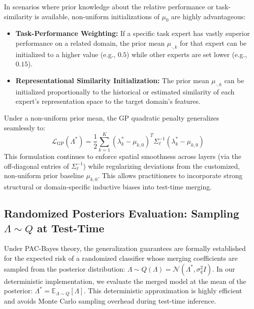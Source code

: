 \documentclass{article}
\theoremstyle{plain}
\theoremstyle{definition}
\theoremstyle{remark}
\begin{document}
In scenarios where prior knowledge about the relative performance or task-similarity is available, non-uniform initializations of $\mu_0$ are highly advantageous:
\begin{itemize}
    \item \textbf{Task-Performance Weighting:} If a specific task expert has vastly superior performance on a related domain, the prior mean $\mu_{\cdot, k}$ for that expert can be initialized to a higher value (e.g., $0.5$) while other experts are set lower (e.g., $0.15$).
    \item \textbf{Representational Similarity Initialization:} The prior mean $\mu_{\cdot, k}$ can be initialized proportionally to the historical or estimated similarity of each expert's representation space to the target domain's features.
\end{itemize}
Under a non-uniform prior mean, the GP quadratic penalty generalizes seamlessly to:
\begin{equation}
\mathcal{L}_{\text{GP}}(\Lambda^*) = \frac{1}{2} \sum_{k=1}^K (\lambda_k^* - \mu_{k, 0})^T \Sigma_{\ell}^{-1} (\lambda_k^* - \mu_{k, 0})
\end{equation}
This formulation continues to enforce spatial smoothness across layers (via the off-diagonal entries of $\Sigma_{\ell}^{-1}$) while regularizing deviations from the customized, non-uniform prior baseline $\mu_{k, 0}$. This allows practitioners to incorporate strong structural or domain-specific inductive biases into test-time merging.

\subsection{Randomized Posteriors Evaluation: Sampling $\Lambda \sim Q$ at Test-Time}
\label{subsec:randomized_posteriors_appendix}

Under PAC-Bayes theory, the generalization guarantees are formally established for the expected risk of a randomized classifier whose merging coefficients are sampled from the posterior distribution: $\Lambda \sim Q(\Lambda) = \mathcal{N}(\Lambda^*, \sigma_q^2 I)$. In our deterministic implementation, we evaluate the merged model at the mean of the posterior: $\Lambda^* = \mathbb{E}_{\Lambda \sim Q}[\Lambda]$. This deterministic approximation is highly efficient and avoids Monte Carlo sampling overhead during test-time inference.
\end{document}
